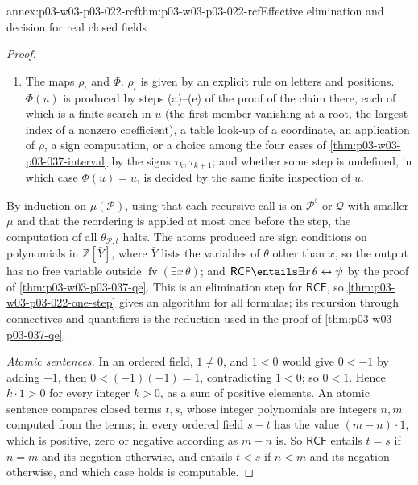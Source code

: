 \begin{annexitem}{annex:p03-w03-p03-022-rcf}{thm:p03-w03-p03-022-rcf}{Effective elimination and decision for real closed fields}
\begin{proof}
\begin{enumerate}
  \(\theta_{\mathcal P,t}\) is the displayed combination of
  \(\theta_{\mathcal P^\flat,t}\) and the \(\theta_{\mathcal Q,u}\) with
  \(u\) in the listed finite set \(\mathbb T_{\mathcal Q}\) and
  \(\Phi(u)=t\).
\item The maps \(\rho_\iota\) and \(\Phi\). \(\rho_\iota\) is given by an
  explicit rule on letters and positions. \(\Phi(u)\) is produced by steps
  (a)--(e) of the proof of the claim there, each of which is a finite
  search in \(u\) (the first member vanishing at a root, the largest index
  of a nonzero coefficient), a table look-up of a coordinate, an
  application of \(\rho\), a sign computation, or a choice among the four
  cases of \cref{thm:p03-w03-p03-037-interval} by the signs
  \(\tau_k,\tau_{k+1}\); and whether some step is undefined, in which case
  \(\Phi(u)=u\), is decided by the same finite inspection of \(u\).
\end{enumerate}
By induction on \(\mu(\mathcal P)\), using that each recursive call is on
\(\mathcal P^\flat\) or \(\mathcal Q\) with smaller \(\mu\) and that the
reordering is applied at most once before the step, the computation of all
\(\theta_{\mathcal P,t}\) halts. The atoms produced are sign conditions on
polynomials in \(\mathbb Z[\bar Y]\), where \(\bar Y\) lists the variables of
\(\theta\) other than \(x\), so the output has no free variable outside
\(\operatorname{fv}(\exists x\,\theta)\); and
\(\mathsf{RCF}\entails\exists x\,\theta\leftrightarrow\psi\) by the proof of
\cref{thm:p03-w03-p03-037-qe}. This is an elimination step for
\(\mathsf{RCF}\), so \cref{thm:p03-w03-p03-022-one-step} gives an
algorithm for all formulas; its recursion through connectives and
quantifiers is the reduction used in the proof of
\cref{thm:p03-w03-p03-037-qe}.

\emph{Atomic sentences.} In an ordered field, \(1\ne0\), and \(1<0\) would
give \(0<-1\) by adding \(-1\), then \(0<(-1)(-1)=1\), contradicting
\(1<0\); so \(0<1\). Hence \(k\cdot1>0\) for every integer \(k>0\), as a sum
of positive elements. An atomic sentence compares closed terms \(t,s\), whose
integer polynomials are integers \(n,m\) computed from the terms; in every
ordered field \(s-t\) has the value \((m-n)\cdot1\), which is positive,
zero or negative according as \(m-n\) is. So \(\mathsf{RCF}\) entails
\(t=s\) if \(n=m\) and its negation otherwise, and entails \(t<s\) if
\(n<m\) and its negation otherwise, and which case holds is computable.


\end{proof}
\end{annexitem}
